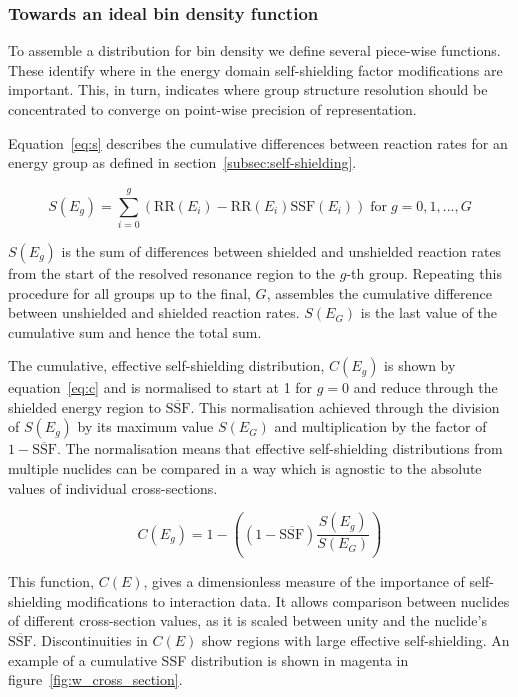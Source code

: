 \subsubsection{Towards an ideal bin density function}
To assemble a distribution for bin density we define several piece-wise functions. These identify where in the energy domain self-shielding factor modifications are important. This, in turn, indicates where group structure resolution should be concentrated to converge on point-wise precision of representation.

Equation~\ref{eq:s} describes the cumulative differences between reaction rates for an energy group as defined in section~\ref{subsec:self-shielding}. 

\begin{equation}
  \label{eq:s}
  S(E_{g}) = \sum_{i=0}^{g} (\mathrm{RR}(E_{i}) - \mathrm{RR}(E_{i})\mathrm{SSF}(E_{i})) \; \mathrm{for} \; g = 0, 1, ..., G
\end{equation}

$S(E_{g})$ is the sum of differences between shielded and unshielded reaction rates from the start of the resolved resonance region to the $g$-th group. Repeating this procedure for all groups up to the final, $G$, assembles the cumulative difference between unshielded and shielded reaction rates. $S(E_{G})$ is the last value of the cumulative sum and hence the total sum.

The cumulative, effective self-shielding distribution, $C(E_{g})$ is shown by equation~\ref{eq:c} and is normalised to start at 1 for $g=0$ and reduce through the shielded energy region to $\overline{\mathrm{SSF}}$. This normalisation achieved through the division of $S(E_{g})$ by its maximum value $S(E_{G})$ and multiplication by the factor of $1-\overline{\mathrm{SSF}}$. The normalisation means that effective self-shielding distributions from multiple nuclides can be compared in a way which is agnostic to the absolute values of individual cross-sections.

\begin{equation}
  \label{eq:c}
  C(E_{g}) = 1 - \left( \left(1-\overline{\mathrm{SSF}}\right) \frac{S(E_{g})} {S(E_{G})}\right)
\end{equation}

This function, $C(E)$, gives a dimensionless measure of the importance of self-shielding modifications to interaction data. It allows comparison between nuclides of different cross-section values, as it is scaled between unity and the nuclide's $\overline{\mathrm{SSF}}$. Discontinuities in $C(E)$ show regions with large effective self-shielding. An example of a cumulative SSF distribution is shown in magenta in figure~\ref{fig:w_cross_section}. 

